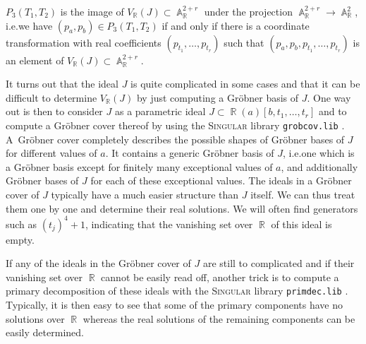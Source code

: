 \documentclass{amsproc}
\theoremstyle{definition}
\newcommand{\Singular}{\textsc{Singular}}
\DeclareMathOperator{\R}{\mathbb{R}}
\DeclareMathOperator{\A}{\mathbb{A}}
\begin{document}
$P_3(T_1, T_2)$ is the image of $V_{\R}(J) \subset \A_{\R}^{2+r}$ under the
projection $\A_{\R}^{2+r} \rightarrow \A_{\R}^2$, i.e.\@ we have
$(p_a, p_b) \in P_3(T_1, T_2)$ if and only if there is a coordinate
transformation with real coefficients $(p_{t_1}, \ldots, p_{t_r})$ such that
$(p_a, p_b, p_{t_1}, \ldots, p_{t_r})$ is an element of
$V_{\R}(J) \subset \A_{\R}^{2+r}$.

It turns out that the ideal $J$ is quite complicated in some cases and that it
can be difficult to determine $V_{\R}(J)$ by just computing a Gr\"obner basis
of $J$. One way out is then to consider $J$ as a parametric ideal
$J \subset \R(a)[b,t_1,\ldots,t_r]$ and to compute a Gr\"obner cover thereof
by using the \Singular{} library \verb+grobcov.lib+ \citep{grobcov}.
A~Gr\"obner cover completely describes the possible shapes of Gr\"obner bases
of $J$ for different values of $a$. It contains a generic Gr\"obner basis of
$J$, i.e.\@ one which is a Gr\"obner basis except for finitely many exceptional
values of $a$, and additionally Gr\"obner bases of $J$ for each of these
exceptional values. The ideals in a Gr\"obner cover of $J$ typically have a
much easier structure than $J$ itself. We can thus treat them one by one and
determine their real solutions. We will often find generators such as
$(t_j)^4+1$, indicating that the vanishing set over $\R$ of this ideal is
empty.

If any of the ideals in the Gr\"obner cover of $J$ are still to complicated and
if their vanishing set over $\R$ cannot be easily read off, another trick is to
compute a primary decomposition of these ideals with the \Singular{} library
\verb+primdec.lib+ \citep{primdec}. Typically, it is then easy to see that some
of the primary components have no solutions over $\R$ whereas the real
solutions of the remaining components can be easily determined.
\end{document}
